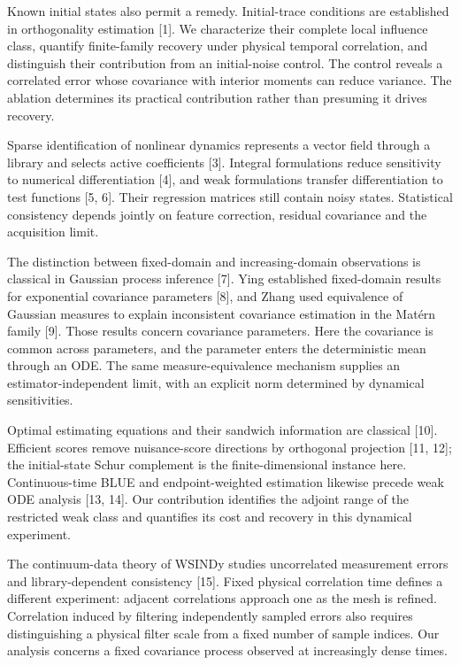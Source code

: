 \documentclass[
  american,
  11pt,
]{article}
\begin{document}
Known initial states also permit a remedy. Initial-trace conditions are
established in orthogonality estimation {[}1{]}. We characterize their
complete local influence class, quantify finite-family recovery under
physical temporal correlation, and distinguish their contribution from
an initial-noise control. The control reveals a correlated error whose
covariance with interior moments can reduce variance. The ablation
determines its practical contribution rather than presuming it drives
recovery.

Sparse identification of nonlinear dynamics represents a vector field
through a library and selects active coefficients {[}3{]}. Integral
formulations reduce sensitivity to numerical differentiation {[}4{]},
and weak formulations transfer differentiation to test functions {[}5,
6{]}. Their regression matrices still contain noisy states. Statistical
consistency depends jointly on feature correction, residual covariance
and the acquisition limit.

The distinction between fixed-domain and increasing-domain observations
is classical in Gaussian process inference {[}7{]}. Ying established
fixed-domain results for exponential covariance parameters {[}8{]}, and
Zhang used equivalence of Gaussian measures to explain inconsistent
covariance estimation in the Matérn family {[}9{]}. Those results
concern covariance parameters. Here the covariance is common across
parameters, and the parameter enters the deterministic mean through an
ODE. The same measure-equivalence mechanism supplies an
estimator-independent limit, with an explicit norm determined by
dynamical sensitivities.

Optimal estimating equations and their sandwich information are
classical {[}10{]}. Efficient scores remove nuisance-score directions by
orthogonal projection {[}11, 12{]}; the initial-state Schur complement
is the finite-dimensional instance here. Continuous-time BLUE and
endpoint-weighted estimation likewise precede weak ODE analysis {[}13,
14{]}. Our contribution identifies the adjoint range of the restricted
weak class and quantifies its cost and recovery in this dynamical
experiment.

The continuum-data theory of WSINDy studies uncorrelated measurement
errors and library-dependent consistency {[}15{]}. Fixed physical
correlation time defines a different experiment: adjacent correlations
approach one as the mesh is refined. Correlation induced by filtering
independently sampled errors also requires distinguishing a physical
filter scale from a fixed number of sample indices. Our analysis
concerns a fixed covariance process observed at increasingly dense
times.
\end{document}
